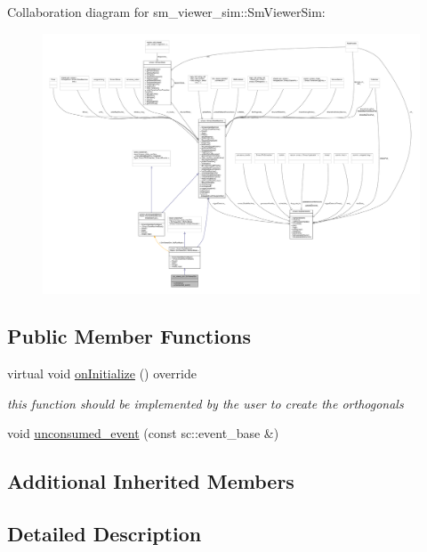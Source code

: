 Collaboration diagram for sm\+\_\+viewer\+\_\+sim\+:\+:Sm\+Viewer\+Sim\+:\nopagebreak
\begin{figure}[H]
\begin{center}
\leavevmode
\includegraphics[width=350pt]{structsm__viewer__sim_1_1SmViewerSim__coll__graph}
\end{center}
\end{figure}
\subsection*{Public Member Functions}
\begin{DoxyCompactItemize}
\item 
virtual void \hyperlink{structsm__viewer__sim_1_1SmViewerSim_a1ad4e963a078af53a55097c6eb78cae0}{on\+Initialize} () override
\begin{DoxyCompactList}\small\item\em this function should be implemented by the user to create the orthogonals \end{DoxyCompactList}\item 
void \hyperlink{structsm__viewer__sim_1_1SmViewerSim_a7b9ef19f73db25f93b1b540eb744365b}{unconsumed\+\_\+event} (const sc\+::event\+\_\+base \&)
\end{DoxyCompactItemize}
\subsection*{Additional Inherited Members}


\subsection{Detailed Description}


